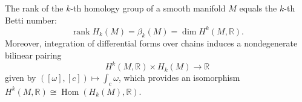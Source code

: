 The rank of the $k$-th homology group of a smooth manifold $M$ equals the $k$-th Betti number:
$$\operatorname{rank} H_k(M) = \beta_k(M) = \dim H^k(M, \mathbb{R}).$$
Moreover, integration of differential forms over chains induces a nondegenerate bilinear pairing
$$H^k(M, \mathbb{R}) \times H_k(M) \to \mathbb{R}$$
given by $([\omega], [c]) \mapsto \int_c \omega$, which provides an isomorphism $H^k(M, \mathbb{R}) \cong \operatorname{Hom}(H_k(M), \mathbb{R})$.
